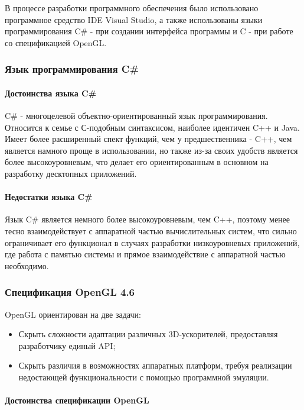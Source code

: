 В процессе разработки программного обеспечения было использовано программное средство IDE Visual Studio, а также использованы языки программирования C\# - при создании интерфейса программы и C - при работе со спецификацией OpenGL.

\subsubsection{Язык программирования C\#}

\paragraph{Достоинства языка C\#}

C\# - многоцелевой объектно-ориентированный язык программирования. Относится к семье с С-подобным синтаксисом, наиболее идентичен C++ и Java. Имеет более расширенный спект функций, чем у предшественника - C++, чем является намного проще в использовании, но также из-за своих удобств является более высокоуровневым, что делает его ориентированным в основном на разработку десктопных приложений.

\paragraph{Недостатки языка C\#}

Язык C\# является немного более высокоуровневым, чем C++, поэтому менее тесно взаимодействует с аппаратной частью вычислительных систем, что сильно  ограничивает его функционал в случаях разработки низкоуровневых приложений, где работа с памятью системы и прямое взаимодействие с аппаратной частью необходимо.

\subsubsection{Спецификация OpenGL 4.6}

OpenGL ориентирован на две задачи:
\begin{itemize}
	\item Скрыть сложности адаптации различных 3D-ускорителей, предоставляя разработчику единый API;
	\item Скрыть различия в возможностях аппаратных платформ, требуя реализации недостающей функциональности с помощью программной эмуляции.
\end{itemize}

\paragraph{Достоинства спецификации OpenGL}

